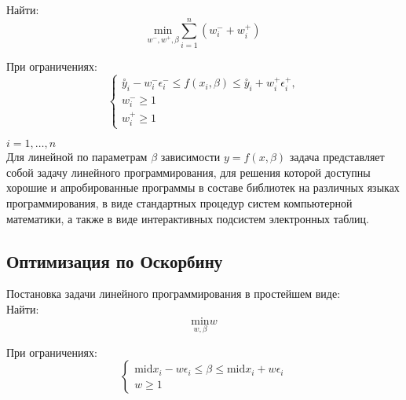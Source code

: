\documentclass[./main.tex]{subfiles}
\begin{document}
Найти: \\

\begin{equation}
	\underset {w^{-}, w^{+}, \beta}{\text{min}} \sum\limits_{i=1}^{n} (w_i^{-} + w_i^{+})
\end{equation}

При ограничениях: \\

\begin{equation}
	\begin{cases}
		\stackrel{\circ}{y}_i - w_i^{-} \epsilon_i^{-} \leq f(x_i,\beta) \leq \stackrel{\circ}{y}_i + w_i^{+} \epsilon_i^{+}, \\
		w_i^{-} \geq 1 \\
		w_i^{+} \geq 1 
	\end{cases}
\end{equation}

$i = 1, \ldots, n$ \\

Для линейной по параметрам $\beta$ зависимости $y = f(x, \beta)$ задача представляет собой задачу линейного программирования, для решения которой доступны хорошие и апробированные программы в составе библиотек на различных языках программирования, в виде стандартных процедур систем компьютерной математики, а также в виде интерактивных подсистем электронных таблиц. 

\subsection{Оптимизация по Оскорбину}

Постановка задачи линейного программирования в простейшем виде: \\

Найти: \\

\begin{equation}
	\underset {w, \beta}{\text{min}} w
\end{equation}

При ограничениях: \\

\begin{equation}
	\begin{cases}
		\text{mid} x_i - w \epsilon_i \leq \beta \leq \text{mid} x_i + w \epsilon_i\\
		w \geq 1 
	\end{cases}
\end{equation}
\end{document}
